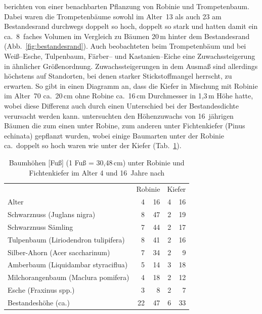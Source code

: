 \documentclass[twocolumn]{scrartcl}
\begin{document}
\citet{ferguson1922robinie,mcintyre1932robinie,chapman1935robinie}
berichten von einer benachbarten Pflanzung von Robinie und
Trompetenbaum. Dabei waren die Trompetenbäume sowohl im Alter~13 als
auch 23 am Bestandesrand durchwegs doppelt so hoch, doppelt so stark
und hatten damit ein ca.\ 8~faches Volumen im Vergleich zu Bäumen
20\,m hinter dem Bestandesrand (Abb.~\ref{fig:bestandesrand}). Auch
\citet{mcintyre1932robinie} beobachteten beim Trompetenbäum und
\citet{chapman1935robinie} bei Weiß--Esche, Tulpenbaum, Färber-- und
Kastanien--Eiche eine Zuwachssteigerung in ähnlicher Größenordnung.
Zuwachssteigerungen in dem Ausmaß sind allerdings höchstens auf
Standorten, bei denen starker Stickstoffmangel herrscht, zu erwarten.
So gibt \citet[S.~107]{krauss1986sauenerWald} in einen Diagramm an,
dass die Kiefer in Mischung mit Robinie im Alter~70 ca.\ 20\,cm ohne
Robine ca.\ 16\,cm Durchmesser in 1,3\,m Höhe hatte, wobei diese
Differenz auch durch einen Unterschied bei der Bestandesdichte
verursacht werden kann. \citet{ashby1986robinieWuchssteigerung}
untersuchten den Höhenzuwachs von 16~jährigen Bäumen die zum einen
unter Robine, zum anderen unter Fichtenkiefer (Pinus echinata) gepflanzt
wurden, wobei einige Baumarten unter der Robinie ca.\ doppelt so hoch waren
wie unter der Kiefer (Tab.~\ref{tab:zuwachsUnterbau}).

\begin{table}[htbp]
  \centering
  \begin{tabular}{lrr|rr}
    & \multicolumn{2}{c|}{Robinie} & \multicolumn{2}{c}{Kiefer} \\
    Alter & 4 & 16 & 4 & 16\\
    \hline
    Schwarznuss (Juglans nigra)          &  8 & 47 & 2 & 19 \\
    Schwarznuss Sämling                  &  7 & 44 & 2 & 17 \\
    Tulpenbaum (Liriodendron tulipifera) &  8 & 41 & 2 & 16 \\
    Silber-Ahorn (Acer saccharinum)      &  7 & 34 & 2 & 9 \\
    Amberbaum (Liquidambar styraciflua)  &  5 & 14 & 3 & 18 \\
    Milchorangenbaum (Maclura pomifera)  &  4 & 18 & 2 & 12 \\
    Esche (Fraxinus spp.)                &  3 &  8 & 2 & 7 \\
    Bestandeshöhe (ca.)                  & 22 & 47 & 6 & 33 \\
  \end{tabular}%
  \caption{Baumhöhen [Fuß] (1 Fuß = 30,48\,cm) unter Robinie und Fichtenkiefer im Alter 4 und 16~Jahre nach \citet{ashby1986robinieWuchssteigerung}}
  \label{tab:zuwachsUnterbau}
\end{table}
\end{document}
